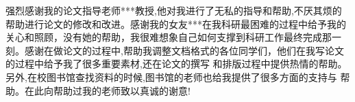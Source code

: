 
\begin{thanks}

强烈感谢我的论文指导老师***教授,他对我进行了无私的指导和帮助,不厌其烦的帮助进行论文的修改和改进。感谢我的女友***在我科研最困难的过程中给予我的关心和照顾，没有她的帮助，我很难想象自己如何支撑到科研工作最终完成那一刻。感谢在做论文的过程中,帮助我调整文档格式的各位同学们，他们在我写论文的过程中给予我了很多重要素材,还在论文的撰写 和排版过程中提供热情的帮助。另外,在校图书馆查找资料的时候,图书馆的老师也给我提供了很多方面的支持与 帮助。在此向帮助过我的老师致以真诚的谢意!

\end{thanks}
